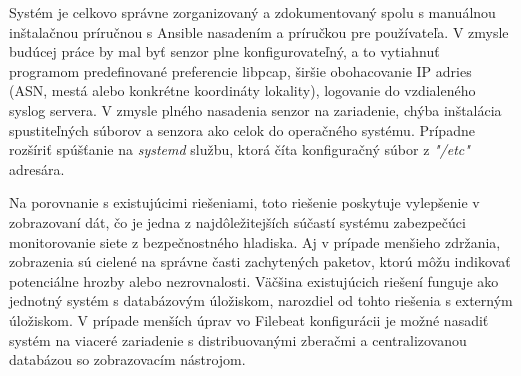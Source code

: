 \documentclass[12pt,a4paper,twoside]{book}
\begin{document}
    Systém je celkovo správne zorganizovaný a zdokumentovaný spolu s ma\-nu\-ál\-nou inštalačnou príručnou s Ansible nasadením a príručkou pre po\-u\-ží\-va\-te\-ľa. V zmysle budúcej práce by mal byť senzor plne konfigurovateľný, a to vytiahnuť programom predefinované preferencie libpcap, širšie obohacovanie IP adries (ASN, mestá alebo konkrétne koordináty lokality), logovanie do vzdialeného syslog servera. V zmysle plného nasadenia senzor na zariadenie, chýba inštalácia spustiteľných súborov a senzora ako celok do operačného systému. Prípadne rozšíriť spúšťanie na \emph{systemd} službu, ktorá číta konfiguračný súbor z \emph{"/etc"} adresára.\par
    Na porovnanie s existujúcimi riešeniami, toto riešenie poskytuje vylepšenie v zobrazovaní dát, čo je jedna z najdôležitejších súčastí systému zabezpečúci monitorovanie siete z bezpečnostného hladiska. Aj v prípade menšieho zdr\-ža\-nia, zobrazenia sú cielené na správne časti zachytených paketov, ktorú môžu indikovať potenciálne hrozby alebo nezrovnalosti. Väčšina existujúcich riešení funguje ako jednotný systém s databázovým úložiskom, narozdiel od tohto riešenia s externým úložiskom. V prípade menších úprav vo Filebeat konfigurácii je možné nasadiť systém na viaceré zariadenie s distribuovanými zberačmi a centralizovanou databázou so zobrazovacím nástrojom.

\newpage


\end{document}
